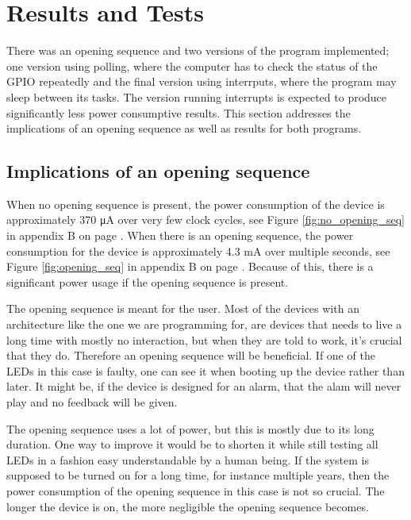 \section{Results and Tests}

There was an opening sequence and two versions of the program implemented; one version using polling, where the computer has to check the status of the GPIO repeatedly and the final version using interrputs, where the program may sleep between its tasks. The version running interrupts is expected to produce significantly less power consumptive results. This section addresses the implications of an opening sequence as well as results for both programs.

\subsection{Implications of an opening sequence}

When no opening sequence is present, the power consumption of the device is approximately 370 \si{\micro\ampere} over very few clock cycles, see Figure \ref{fig:no_opening_seq} in appendix B on page \pageref{fig:no_opening_seq}. When there is an opening sequence, the power consumption for the device is approximately 4.3 \si{\milli\ampere} over multiple seconds, see Figure \ref{fig:opening_seq} in appendix B on page \pageref{fig:opening_seq}. Because of this, there is a significant power usage if the opening sequence is present.

The opening sequence is meant for the user. Most of the devices with an architecture like the one we are programming for, are devices that needs to live a long time with mostly no interaction, but when they are told to work, it's crucial that they do. Therefore an opening sequence will be beneficial. If one of the LEDs in this case is faulty, one can see it when booting up the device rather than later. It might be, if the device is designed for an alarm, that the alam will never play and no feedback will be given.

The opening sequence uses a lot of power, but this is mostly due to its long duration. One way to improve it would be to shorten it while still testing all LEDs in a fashion easy understandable by a human being. If the system is supposed to be turned on for a long time, for instance multiple years, then the power consumption of the opening sequence in this case is not so crucial. The longer the device is on, the more negligible the opening sequence becomes.

